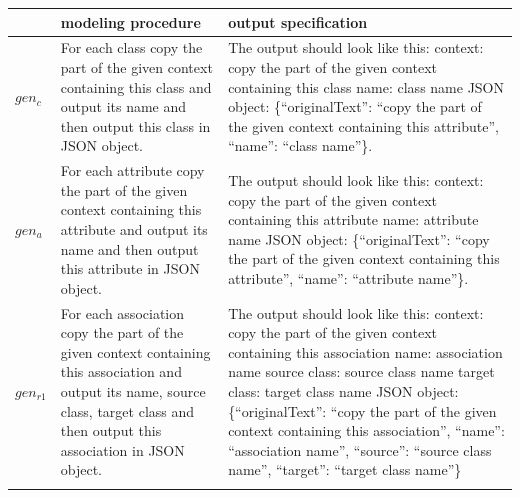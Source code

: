 \begin{table}[!h]
    \scriptsize
    \centering
    \setlength{\tabcolsep}{0.5em}
\begin{tabular}{@{}l>{\raggedright\arraybackslash}p{}>{\raggedright\arraybackslash}p{}@{}}
         & modeling procedure & output specification \\
    \toprule
    \addlinespace
$gen_c$ & For each class copy the part of the given context containing this class and output its name and then output this class in JSON object. & The output should look like this: \newline
context: copy the part of the given context containing this class \newline
name: class name \newline
JSON object: \{``originalText'': ``copy the part of the given context containing this attribute'', ``name'': ``class name''\}. \\
\addlinespace

$gen_a$ & For each attribute copy the part of the given context containing this attribute and output its name and then output this attribute in JSON object. & The output should look like this: \newline
context: copy the part of the given context containing this attribute \newline
name: attribute name \newline
JSON object: \{``originalText'': ``copy the part of the given context containing this attribute'', ``name'': ``attribute name''\}. \\
\addlinespace

$gen_{r1}$ & For each association copy the part of the given context containing this association and output its name, source class, target class and then output this association in JSON object. &
The output should look like this: \newline
context: copy the part of the given context containing this association \newline
name: association name \newline
source class: source class name \newline
target class: target class name \newline
JSON object: \{``originalText'': ``copy the part of the given context containing this association'', ``name'': ``association name'', ``source'': ``source class name'', ``target'': ``target class name''\} \\
\addlinespace


\end{tabular}
\end{table}
